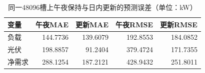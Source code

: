 \begin{table}[H]
\centering\small
\caption{同一48096槽上午夜保持与日内更新的预测误差（单位：kW）}\label{tab:q3-prediction}
\begin{tabular}{lrrrr}
\toprule
变量 & 午夜MAE & 更新MAE & 午夜RMSE & 更新RMSE\\
\midrule
负载 & 144.7736 & 139.6079 & 192.8553 & 184.0852\\
光伏 & 198.8857 & 91.2404 & 379.4724 & 171.7355\\
净需求 & 288.1254 & 187.2121 & 428.9432 & 251.8011\\
\bottomrule
\end{tabular}
\end{table}
